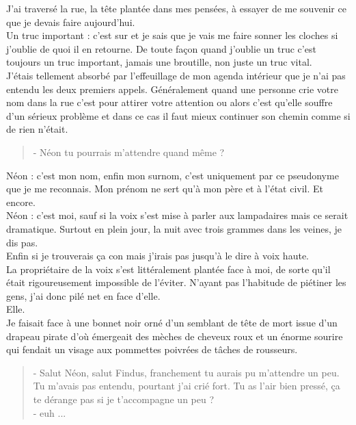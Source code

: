 J'ai traversé la rue, la tête plantée dans mes pensées, à essayer de me souvenir ce que je devais faire aujourd'hui. \\
Un truc important : c'est sur et je sais que je vais me faire sonner les cloches si j'oublie de quoi il en retourne. De toute façon quand j'oublie un truc c'est toujours un truc important, jamais une broutille, non juste un truc vital. \\

J'étais tellement absorbé par l’effeuillage de mon agenda intérieur que je n'ai pas entendu les deux premiers appels. Généralement quand une personne crie votre nom dans la rue c'est pour attirer votre attention ou alors c'est qu'elle souffre d'un sérieux problème et dans ce cas il faut mieux continuer son chemin comme si de rien n'était. \\

\begin{quote}
- Néon tu pourrais m'attendre quand même ? \\
\end{quote}

Néon : c'est mon nom, enfin mon surnom, c'est uniquement par ce pseudonyme que je me reconnais. Mon prénom ne sert qu'à mon père et à l'état civil. Et encore. \\
Néon : c'est moi, sauf si la voix s'est mise à parler aux lampadaires mais ce serait dramatique. Surtout en plein jour, la nuit avec trois grammes dans les veines, je dis pas. \\
Enfin si je trouverais ça con mais j'irais pas jusqu'à le dire à voix haute. \\

La propriétaire de la voix s'est littéralement plantée face à moi, de sorte qu'il était rigoureusement impossible de l'éviter. N'ayant pas l'habitude de piétiner les gens, j'ai donc pilé net en face d'elle. \\
Elle.\\
Je faisait face à une bonnet noir orné d'un semblant de tête de mort issue d'un drapeau pirate d'où émergeait des mèches de cheveux roux et un énorme sourire qui fendait un visage aux pommettes poivrées de tâches de rousseurs. \\

\begin{quote}
- Salut Néon, salut Findus, franchement tu aurais pu m'attendre un peu. Tu m'avais pas entendu, pourtant j'ai crié fort. Tu as l'air bien pressé, ça te dérange pas si je t'accompagne un peu ?\\
- euh ...
\end{quote}

